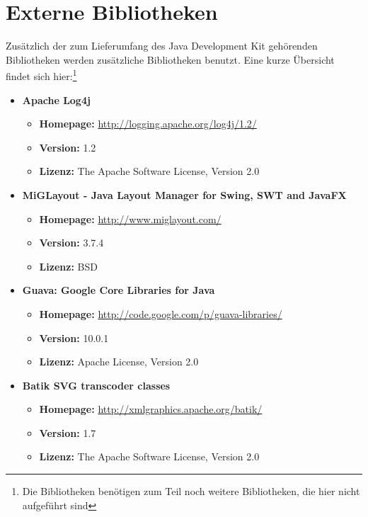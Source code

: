 \documentclass[12pt,a4paper]{scrartcl}
\begin{document}
\section{Externe Bibliotheken}
Zusätzlich der zum Lieferumfang des Java Development Kit gehörenden Bibliotheken werden zusätzliche Bibliotheken benutzt. Eine kurze Übersicht findet sich hier:\footnote{Die Bibliotheken benötigen zum Teil noch weitere Bibliotheken, die hier nicht aufgeführt sind}
\begin{itemize}
 \item \textbf{Apache Log4j}
    \begin{itemize}
     \item \textbf{Homepage:} \url{http://logging.apache.org/log4j/1.2/}
     \item \textbf{Version:} 1.2
     \item \textbf{Lizenz:} The Apache Software License, Version 2.0
    \end{itemize}
    
 \item \textbf{MiGLayout - Java Layout Manager for Swing, SWT and JavaFX}
    \begin{itemize}
     \item \textbf{Homepage:} \url{http://www.miglayout.com/}
     \item \textbf{Version:} 3.7.4
     \item \textbf{Lizenz:} BSD
    \end{itemize}
    
 \item \textbf{Guava: Google Core Libraries for Java}
    \begin{itemize}
     \item \textbf{Homepage:} \url{http://code.google.com/p/guava-libraries/}
     \item \textbf{Version:} 10.0.1
     \item \textbf{Lizenz:} Apache License, Version 2.0
    \end{itemize}
    
 \item \textbf{Batik SVG transcoder classes}
    \begin{itemize}
     \item \textbf{Homepage:} \url{http://xmlgraphics.apache.org/batik/}
     \item \textbf{Version:} 1.7
     \item \textbf{Lizenz:} The Apache Software License, Version 2.0
    \end{itemize}
    

\end{itemize}
\end{document}
